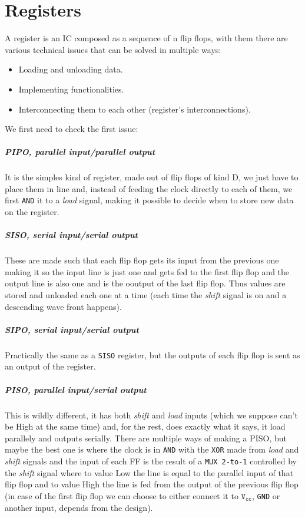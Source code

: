\documentclass{scrartcl}
\begin{document}
    \section{Registers}
    A register is an IC composed as a sequence of n flip flops, with them there are various technical issues that can be solved in multiple ways:
    \begin{itemize}
        \item Loading and unloading data.
        \item Implementing functionalities.
        \item Interconnecting them to each other (register's interconnections).
    \end{itemize}
    We first need to check the first issue:
    \subparagraph{PIPO, parallel input/parallel output} It is the simples kind of register, made out of flip flops of kind D, we just have to place them in line and, instead of feeding the clock directly to each of them, we first \texttt{AND} it to a \emph{load} signal, making it possible to decide when to store new data on the register.
    \subparagraph{SISO, serial input/serial output} These are made such that each flip flop gets its input from the previous one making it so the input line is just one and gets fed to the first flip flop and the output line is also one and is the ooutput of the last flip flop. Thus values are stored and unloaded each one at a time (each time the \emph{shift} signal is on and a descending wave front happens).
    \subparagraph{SIPO, serial input/serial output} Practically the same as a \texttt{SISO} register, but the outputs of each flip flop is sent as an output of the register.
    \subparagraph{PISO, parallel input/serial output} This is wildly different, it has both \emph{shift} and \emph{load} inputs (which we suppose can't be High at the same time) and, for the rest, does exactly what it says, it load parallely and outputs serially. There are multiple ways of making a PISO, but maybe the best one is where the clock is in \texttt{AND} with the \texttt{XOR} made from \emph{load} and \emph{shift} signals and the input of each FF is the result of a \texttt{MUX 2-to-1} controlled by the \emph{shift} signal where to value Low the line is equal to the parallel input of that flip flop and to value High the line is fed from the output of the previous flip flop (in case of the first flip flop we can choose to either connect it to $\texttt{V}_{\texttt{cc}}$, \texttt{GND} or another input, depends from the design).\\
\end{document}
